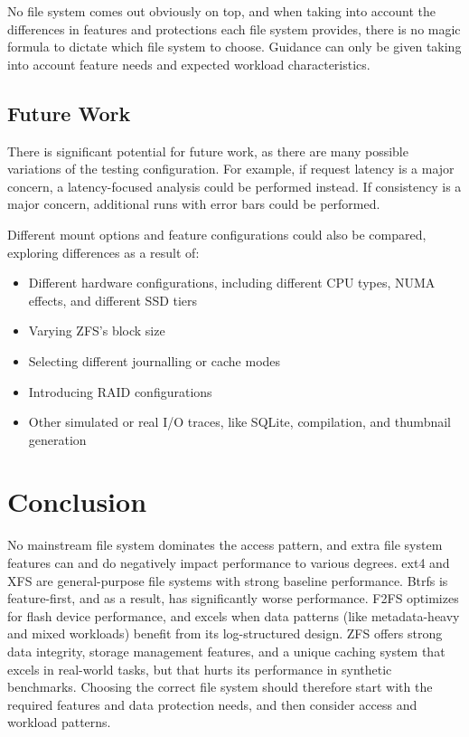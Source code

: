 \documentclass[letterpaper,twocolumn,10pt]{article}
\begin{document}
No file system comes out obviously on top, and when taking into account the differences in features and protections each file system provides, there is no magic formula to dictate which file system to choose. Guidance can only be given taking into account feature needs and expected workload characteristics.

\subsection{Future Work}
There is significant potential for future work, as there are many possible variations of the testing configuration. For example, if request latency is a major concern, a latency-focused analysis could be performed instead. If consistency is a major concern, additional runs with error bars could be performed.

Different mount options and feature configurations could also be compared, exploring differences as a result of:
\begin{itemize}
    \item Different hardware configurations, including different CPU types, NUMA effects, and different SSD tiers
    \item Varying ZFS's block size
    \item Selecting different journalling or cache modes
    \item Introducing RAID configurations
    \item Other simulated or real I/O traces, like SQLite, compilation, and thumbnail generation
\end{itemize}

\section{Conclusion}
No mainstream file system dominates the access pattern, and extra file system features can and do negatively impact performance to various degrees. ext4 and XFS are general-purpose file systems with strong baseline performance. Btrfs is feature-first, and as a result, has significantly worse performance. F2FS optimizes for flash device performance, and excels when data patterns (like metadata-heavy and mixed workloads) benefit from its log-structured design. ZFS offers strong data integrity, storage management features, and a unique caching system that excels in real-world tasks, but that hurts its performance in synthetic benchmarks. Choosing the correct file system should therefore start with the required features and data protection needs, and then consider access and workload patterns.

{\footnotesize 
}

\end{document}
